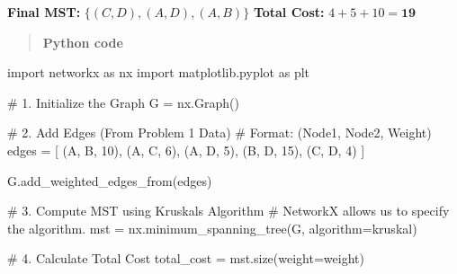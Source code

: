 \documentclass[
  letterpaper,
  DIV=11,
  numbers=noendperiod]{scrreprt}
\newenvironment{Shaded}{\begin{snugshade}}{\end{snugshade}}
\newcommand{\CommentTok}[1]{\textcolor[rgb]{0.37,0.37,0.37}{#1}}
\newcommand{\DecValTok}[1]{\textcolor[rgb]{0.68,0.00,0.00}{#1}}
\newcommand{\ImportTok}[1]{\textcolor[rgb]{0.00,0.46,0.62}{#1}}
\newcommand{\NormalTok}[1]{\textcolor[rgb]{0.00,0.23,0.31}{#1}}
\newcommand{\OperatorTok}[1]{\textcolor[rgb]{0.37,0.37,0.37}{#1}}
\newcommand{\StringTok}[1]{\textcolor[rgb]{0.13,0.47,0.30}{#1}}
\begin{document}
\textbf{Final MST:} \(\{(C,D), (A,D), (A,B)\}\) \textbf{Total Cost:}
\(4 + 5 + 10 = \mathbf{19}\)

\begin{quote}
\textbf{Python code}
\end{quote}

\begin{Shaded}
\begin{Highlighting}[]
\ImportTok{import}\NormalTok{ networkx }\ImportTok{as}\NormalTok{ nx}
\ImportTok{import}\NormalTok{ matplotlib.pyplot }\ImportTok{as}\NormalTok{ plt}

\CommentTok{\# 1. Initialize the Graph}
\NormalTok{G }\OperatorTok{=}\NormalTok{ nx.Graph()}

\CommentTok{\# 2. Add Edges (From Problem 1 Data)}
\CommentTok{\# Format: (Node1, Node2, Weight)}
\NormalTok{edges }\OperatorTok{=}\NormalTok{ [}
\NormalTok{    (}\StringTok{\textquotesingle{}A\textquotesingle{}}\NormalTok{, }\StringTok{\textquotesingle{}B\textquotesingle{}}\NormalTok{, }\DecValTok{10}\NormalTok{),}
\NormalTok{    (}\StringTok{\textquotesingle{}A\textquotesingle{}}\NormalTok{, }\StringTok{\textquotesingle{}C\textquotesingle{}}\NormalTok{, }\DecValTok{6}\NormalTok{),}
\NormalTok{    (}\StringTok{\textquotesingle{}A\textquotesingle{}}\NormalTok{, }\StringTok{\textquotesingle{}D\textquotesingle{}}\NormalTok{, }\DecValTok{5}\NormalTok{),}
\NormalTok{    (}\StringTok{\textquotesingle{}B\textquotesingle{}}\NormalTok{, }\StringTok{\textquotesingle{}D\textquotesingle{}}\NormalTok{, }\DecValTok{15}\NormalTok{),}
\NormalTok{    (}\StringTok{\textquotesingle{}C\textquotesingle{}}\NormalTok{, }\StringTok{\textquotesingle{}D\textquotesingle{}}\NormalTok{, }\DecValTok{4}\NormalTok{)}
\NormalTok{]}

\NormalTok{G.add\_weighted\_edges\_from(edges)}

\CommentTok{\# 3. Compute MST using Kruskal\textquotesingle{}s Algorithm}
\CommentTok{\# NetworkX allows us to specify the algorithm.}
\NormalTok{mst }\OperatorTok{=}\NormalTok{ nx.minimum\_spanning\_tree(G, algorithm}\OperatorTok{=}\StringTok{\textquotesingle{}kruskal\textquotesingle{}}\NormalTok{)}

\CommentTok{\# 4. Calculate Total Cost}
\NormalTok{total\_cost }\OperatorTok{=}\NormalTok{ mst.size(weight}\OperatorTok{=}\StringTok{\textquotesingle{}weight\textquotesingle{}}\NormalTok{)}


\end{Highlighting}
\end{Shaded}
\end{document}
